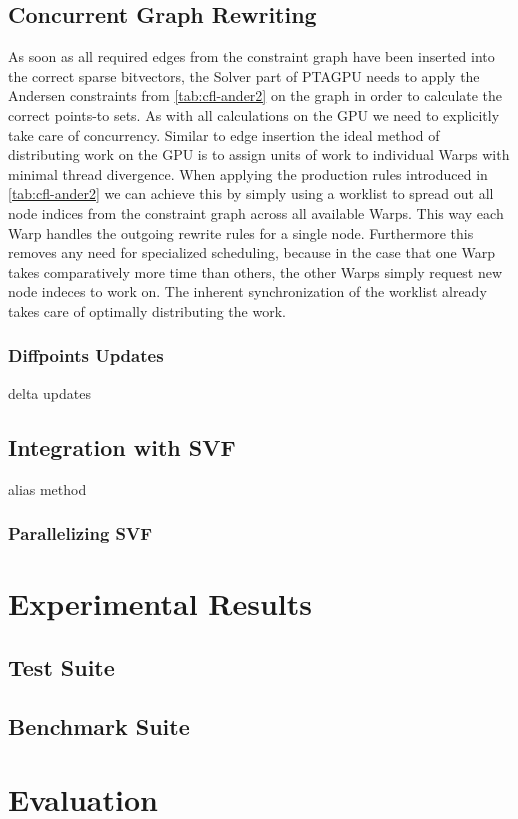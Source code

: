 \subsection{Concurrent Graph Rewriting}
As soon as all required edges from the constraint graph have been inserted into the correct sparse bitvectors, the Solver part of PTAGPU needs to apply the Andersen constraints from \autoref{tab:cfl-ander2} on the graph in order to calculate the correct points-to sets.
As with all calculations on the GPU we need to explicitly take care of concurrency.
Similar to edge insertion the ideal method of distributing work on the GPU is to assign units of work to individual Warps with minimal thread divergence.
When applying the production rules introduced in \autoref{tab:cfl-ander2} we can achieve this by simply using a worklist to spread out all node indices from the constraint graph across all available Warps.
This way each Warp handles the outgoing rewrite rules for a single node.
Furthermore this removes any need for specialized scheduling, because in the case that one Warp takes comparatively more time than others, the other Warps simply request new node indeces to work on.
The inherent synchronization of the worklist already takes care of optimally distributing the work.

\subsubsection{Diffpoints Updates}\label{sec:memory}
delta updates
\subsection{Integration with SVF}
alias method
\subsubsection{Parallelizing SVF}
\section{Experimental Results}
\subsection{Test Suite}
\subsection{Benchmark Suite}
\section{Evaluation}
